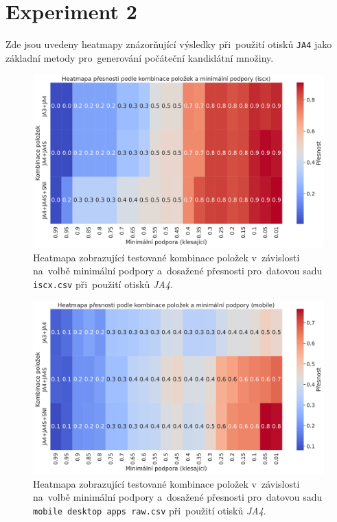 \section{Experiment 2}
\label{sec:appendix:ex2}

Zde jsou uvedeny heatmapy znázorňující výsledky při~použití otisků \texttt{JA4} jako základní metody pro~generování počáteční kandidátní množiny.

\begin{figure}[H]
    \centering
    \includegraphics[width=\linewidth]{obrazky-figures/exps/ex2-iscx-heatmap_not_comb.pdf}
    \caption{Heatmapa zobrazující testované kombinace položek v~závislosti na~volbě minimální podpory a~dosažené přesnosti pro~datovou sadu \texttt{iscx.csv} při~použití otisků \textit{JA4}. }
    \label{fig:appendix-heatmap-iscx}
\end{figure}

\begin{figure}[H]
    \centering
    \includegraphics[width=\linewidth]{obrazky-figures/exps/ex2-mobile-heatmap_not_comb.pdf}
    \caption{Heatmapa zobrazující testované kombinace položek v~závislosti na~volbě minimální podpory a~dosažené přesnosti pro~datovou sadu \texttt{mobile desktop apps raw.csv} při~použití otisků \textit{JA4}. }
    \label{fig:appendix-heatmap-mobile}
\end{figure}

